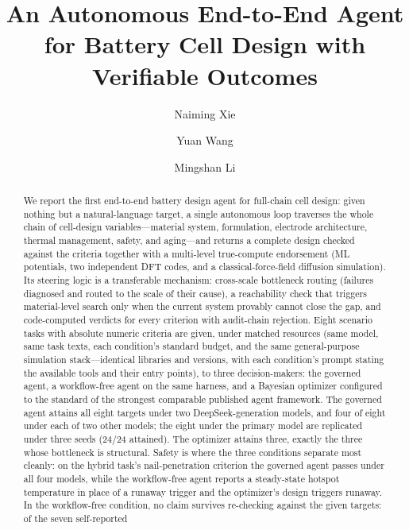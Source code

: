 \documentclass[review,11pt]{elsarticle}
\begin{document}
\begin{frontmatter}

\title{An Autonomous End-to-End Agent for Battery Cell Design with Verifiable Outcomes}

\author[inst1]{Naiming Xie}
\author[inst1]{Yuan Wang}
\author[inst1]{Mingshan Li}


\begin{abstract}
We report the first end-to-end battery design agent for full-chain cell
design: given nothing but a natural-language target, a single autonomous
loop traverses the whole chain of cell-design variables---material system,
formulation, electrode architecture, thermal management, safety, and
aging---and returns a complete design checked against the criteria together with a
multi-level true-compute endorsement (ML potentials, two independent DFT
codes, and a classical-force-field diffusion simulation). Its steering
logic is a transferable mechanism: cross-scale bottleneck routing
(failures diagnosed and routed to the scale of their cause), a reachability
check that triggers material-level search only when the current
system provably cannot close the gap, and code-computed verdicts for
every criterion with audit-chain rejection. Eight scenario tasks with
absolute numeric criteria are given, under
matched resources (same model, same task texts, each condition's standard
budget, and the same general-purpose simulation stack---identical libraries
and versions, with each condition's prompt stating the available tools and
their entry points), to three decision-makers: the governed agent, a
workflow-free agent on the same harness, and a Bayesian optimizer
configured to the standard of the strongest comparable published agent
framework. The governed agent attains all eight targets under two
DeepSeek-generation models, and four of eight under each of two
other models; the eight under the primary model are replicated
under three seeds (24/24 attained). The optimizer attains three, exactly
the three whose bottleneck is structural. Safety is where the three
conditions separate most cleanly: on the hybrid task's nail-penetration
criterion the governed agent passes under all four models, while the
workflow-free agent reports a steady-state hotspot temperature in place of
a runaway trigger and the optimizer's design triggers runaway. In the
workflow-free condition, no claim
survives re-checking against the given targets: of the seven self-reported

\end{abstract}
\end{frontmatter}
\end{document}
